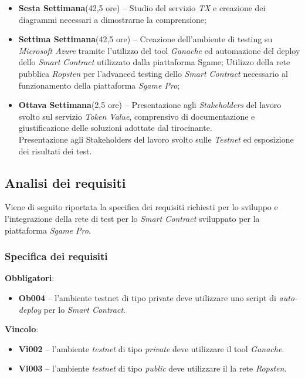 \documentclass[11pt]{thesistemp}
\begin{document}
\begin{itemize}
	\item \textbf{Sesta Settimana}(42,5 ore) – Studio del servizio \textit{TX} e creazione dei diagrammi necessari a dimostrarne la comprensione;
	\item \textbf{Settima Settimana}(42,5 ore) – Creazione dell’ambiente di testing su \textit{Microsoft Azure} tramite l’utilizzo del tool \textit{Ganache} ed automazione del deploy dello \textit{Smart Contract} utilizzato dalla piattaforma Sgame; Utilizzo della rete pubblica \textit{Ropsten} per l'advanced testing dello \textit{Smart Contract} necessario al funzionamento della piattaforma \textit{Sgame Pro};
	\item \textbf{Ottava Settimana}(2,5 ore) – Presentazione agli \textit{Stakeholders} del lavoro svolto sul servizio \textit{Token Value}, comprensivo di documentazione e giustificazione delle soluzioni adottate dal tirocinante.\\
Presentazione agli Stakeholders del lavoro svolto sulle \textit{Testnet} ed esposizione dei risultati dei test.
\end{itemize}
\pagebreak
\subsection{Analisi dei requisiti}

Viene di seguito riportata la specifica dei requisiti richiesti per lo sviluppo e l'integrazione della rete di test per lo \textit{Smart Contract} sviluppato per la piattaforma \textit{Sgame Pro}.

\subsubsection{Specifica dei requisiti}

\textbf{Obbligatori}:
\begin{itemize}
	\item \textbf{Ob004} – l’ambiente testnet di tipo private deve utilizzare uno script di \textit{auto-deploy} per lo \textit{Smart Contract}.
\end{itemize}
\textbf{Vincolo}:
\begin{itemize}
	\item \textbf{Vi002} – l’ambiente \textit{testnet} di tipo \textit{private} deve utilizzare il tool \textit{Ganache}.
	\item \textbf{Vi003} – l’ambiente \textit{testnet} di tipo \textit{public} deve utilizzare il la rete \textit{Ropsten}.
\end{itemize}
\pagebreak
\end{document}
